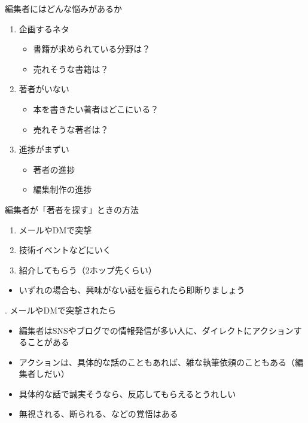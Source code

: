 \documentclass[14pt,dvipdfmx,uplatex]{beamer}
\begin{document}
\begin{frame}[t]{\inhibitglue 編集者にはどんな悩みがあるか}
  \sffamily
    \begin{enumerate}
      \item<gray@1-> {\color{10gray} 企画するネタ}
        \begin{itemize}
          \item {\color{10gray}書籍が求められている分野は？}
          \item {\color{10gray}売れそうな書籍は？\\[3ex]}
        \end{itemize} 
      \item 著者がいない
        \begin{itemize}
          \item 本を書きたい著者はどこにいる？
          \item 売れそうな著者は？\\[3ex]
        \end{itemize} 
      \item<gray@1-> {\color{10gray} 進捗がまずい}
        \begin{itemize}
          \item {\color{10gray} 著者の進捗}
          \item {\color{10gray} 編集制作の進捗}
        \end{itemize}
    \end{enumerate}
\end{frame}

\begin{frame}[t]{\leavevmode\inhibitglue 編集者が「著者を探す」ときの方法}
  \sffamily
  \begin{enumerate}
      \item メールやDMで突撃
      \item 技術イベントなどにいく
      \item 紹介してもらう（2ホップ先くらい）
  \end{enumerate}
  \begin{itemize}
      \item いずれの場合も、興味がない話を振られたら即断りましょう
  \end{itemize}
\end{frame}

\begin{frame}[t]{. メールやDMで突撃されたら}
  \sffamily
  \begin{itemize}
    \item 編集者はSNSやブログでの情報発信が多い人に、ダイレクトにアクションすることがある
    \item アクションは、具体的な話のこともあれば、雑な執筆依頼のこともある（編集者しだい）
    \item 具体的な話で誠実そうなら、反応してもらえるとうれしい
    \item 無視される、断られる、などの覚悟はある
  \end{itemize}
\end{frame}
\end{document}
